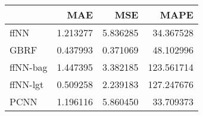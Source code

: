 \begin{tabular}{lrrr}
\toprule
{} &       MAE &       MSE &        MAPE \\
\midrule
ffNN     &  1.213277 &  5.836285 &   34.367528 \\
GBRF     &  0.437993 &  0.371069 &   48.102996 \\
ffNN-bag &  1.447395 &  3.382185 &  123.561714 \\
ffNN-lgt &  0.509258 &  2.239183 &  127.247676 \\
PCNN     &  1.196116 &  5.860450 &   33.709373 \\
\bottomrule
\end{tabular}
